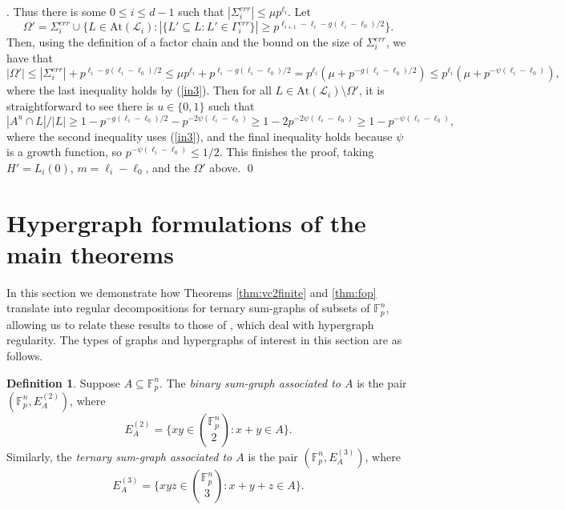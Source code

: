 \documentclass[12pt,oneside,british,a4wide]{amsart}
\numberwithin{equation}{section}
\theoremstyle{definition}
\newtheorem{definition}[theorem]{Definition}
\def\F{\mathbb{F}}
\newcommand{\calL}{\mathcal{L}}
\newcommand{\At}{{\mathrm{At}}}
\newenvironment{proofof}[1]{\indent{\itshape Proof of #1}.\;}{\qed}
\begin{document}
\begin{proofof}{Theorem \ref{thm:almoststableinhstrong}}
Thus there is some $0\leq i\leq d-1$ such that $|\Sigma^{err}_i|\leq \mu p^{\ell_i}$. Let 
$$
\Omega'=\Sigma_i^{err}\cup \{L\in \At(\calL_i): |\{L'\subseteq L: L'\in \Gamma^{err}_i\}|\geq   p^{\ell_{i+1}-\ell_i-g(\ell_i-\ell_0)/2}\}.
$$
Then, using the definition of a factor chain and the bound on the size of $\Sigma_i^{err}$, we have that 
$$
|\Omega'|\leq |\Sigma^{err}_i|+  p^{\ell_i-g(\ell_i-\ell_0)/2}\leq \mu p^{\ell_i}+  p^{\ell_i-g(\ell_i-\ell_0)/2}=p^{\ell_i}(\mu+p^{-g(\ell_i-\ell_0)/2})\leq p^{\ell_i}(\mu+p^{-\psi(\ell_i-\ell_0)}),
$$
where the last inequality holds by (\ref{in3}).   Then for all $L\in \At(\calL_i)\setminus \Omega'$, it is straightforward to see there is $u\in \{0,1\}$ such that 
    $$
    |A^u\cap L|/|L|\geq 1-  p^{-g(\ell_i-\ell_0)/2}-  p^{-2\psi(\ell_i-\ell_0)}\geq 1- 2  p^{-2\psi(\ell_i-\ell_0)}\geq 1- p^{-\psi(\ell_i-\ell_0)},
    $$
where the second inequality uses (\ref{in3}), and the final inequality holds because $\psi$ is a growth function, so $p^{-\psi(\ell_i-\ell_0)}\leq 1/2$.  This finishes the proof, taking $H'=L_i(0)$, $m=\ell_i-\ell_0$, and the $\Omega'$ above.
\end{proofof}



\appendix


\section{Hypergraph formulations of the main theorems}\label{ss:hypergraphs}  
In this section we demonstrate how Theorems \ref{thm:vc2finite} and \ref{thm:fop} translate into regular decompositions for ternary sum-graphs of subsets of $\F_p^n$, allowing us to relate these results to those of \cite{Terry.2021b}, which deal with hypergraph regularity.   The types of graphs and hypergraphs of interest in this section are as follows.

\begin{definition}
Suppose $A\subseteq \F_p^n$. The \emph{binary sum-graph associated to $A$} is the pair $(\F_p^n, E_A^{(2)})$, where 
$$
E_A^{(2)}=\{xy\in {\F_p^n\choose 2}: x+y\in A\}.
$$
 Similarly, the \emph{ternary sum-graph associated to $A$} is the pair $(\F_p^n, E_A^{(3)})$, where
 $$
 E_A^{(3)}=\{xyz\in {\F_p^n\choose 3}: x+y+z\in A\}.
 $$
\end{definition}
\end{document}
